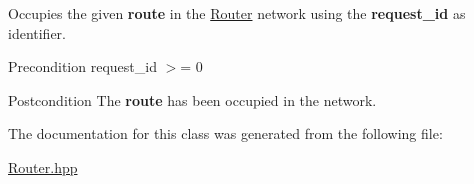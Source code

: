 Occupies the given {\bfseries route} in the \hyperlink{class_router}{Router} network using the {\bfseries request\-\_\-id} as identifier. 

\begin{DoxyPrecond}{Precondition}
request\-\_\-id $>$= 0 
\end{DoxyPrecond}
\begin{DoxyPostcond}{Postcondition}
The {\bfseries route} has been occupied in the network. 
\end{DoxyPostcond}


The documentation for this class was generated from the following file\-:\begin{DoxyCompactItemize}
\item 
\hyperlink{_router_8hpp}{Router.\-hpp}\end{DoxyCompactItemize}
